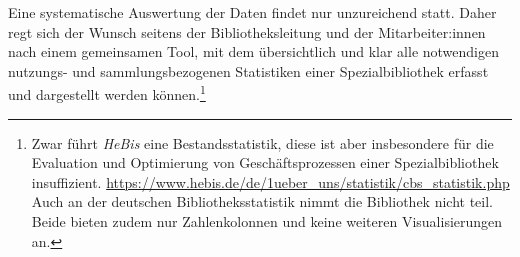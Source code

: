 Eine systematische Auswertung der Daten findet nur unzureichend statt.
Daher regt sich der Wunsch seitens der Bibliotheksleitung und der Mitarbeiter:innen nach einem gemeinsamen Tool,
mit dem übersichtlich und klar alle notwendigen nutzungs- und sammlungsbezogenen Statistiken einer
Spezialbibliothek erfasst und dargestellt werden können.\footnote{Zwar führt \textit{HeBis} eine Bestandsstatistik, diese ist aber insbesondere für die
Evaluation und Optimierung von Geschäftsprozessen einer Spezialbibliothek
insuffizient. \url{https://www.hebis.de/de/1ueber_uns/statistik/cbs_statistik.php} 
Auch an der deutschen Bibliotheksstatistik nimmt die Bibliothek nicht teil. Beide bieten zudem nur Zahlenkolonnen und keine weiteren Visualisierungen an.}

